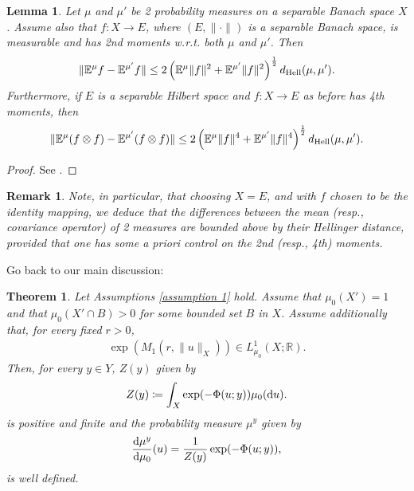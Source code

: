 \documentclass[oneside,11pt]{book}
\numberwithin{equation}{section}
\newtheorem{lemma}{Lemma}[section]
\newtheorem{theorem}{Theorem}[section]
\newtheorem{remark}{Remark}[section]
\begin{document}
\begin{lemma}
    Let $\mu$ and $\mu'$ be 2 probability measures on a separable Banach space $X$. Assume also that $f:X\to E$, where $(E,\|\cdot\|)$ is a separable Banach space, is measurable and has 2nd moments w.r.t. both $\mu$ and $\mu'$. Then
    \begin{align*}
        \|\mathbb{E}^\mu f - \mathbb{E}^{\mu'}f\|\le 2\left(\mathbb{E}^\mu\|f\|^2 + \mathbb{E}^{\mu'}\|f\|^2\right)^{\frac{1}{2}}d_{\rm Hell}(\mu,\mu').
    \end{align*}
    Furthermore, if $E$ is a separable Hilbert space and $f:X\to E$ as before has 4th moments, then
    \begin{align*}
        \|\mathbb{E}^\mu(f\otimes f) - \mathbb{E}^{\mu'}(f\otimes f)\|\le 2\left(\mathbb{E}^\mu\|f\|^4 + \mathbb{E}^{\mu'}\|f\|^4\right)^{\frac{1}{2}}d_{\rm Hell}(\mu,\mu').
    \end{align*}
\end{lemma}

\begin{proof}
    See \cite[p. 410]{Dashti_Stuart2017}.
\end{proof}

\begin{remark}
    Note, in particular, that choosing $X = E$, and with $f$ chosen to be the identity mapping, we deduce that the differences between the mean (resp., covariance operator) of 2 measures are bounded above by their Hellinger distance, provided that one has some a priori control on the 2nd (resp., 4th) moments.
\end{remark}
Go back to our main discussion:

\begin{theorem}
    Let Assumptions \ref{assumption 1} hold. Assume that $\mu_0(X') = 1$ and that $\mu_0(X'\cap B) > 0$ for some bounded set $B$ in $X$. Assume additionally that, for every fixed $r > 0$,
    \begin{align*}
        \exp(M_1(r,\|u\|_X))\in L_{\mu_0}^1(X;\mathbb{R}).
    \end{align*}
    Then, for every $y\in Y$, $Z(y)$ given by
    \begin{align*}
        Z(y)\coloneqq\int_X \exp(-\Phi(u;y))\mu_0({\rm d}u).
    \end{align*}
    is positive and finite and the probability measure $\mu^y$ given by
    \begin{align*}
        \frac{{\rm d}\mu^y}{{\rm d}\mu_0}(u) = \frac{1}{Z(y)}\exp(-\Phi(u;y)),
    \end{align*}
    is well defined.
\end{theorem}
\end{document}
